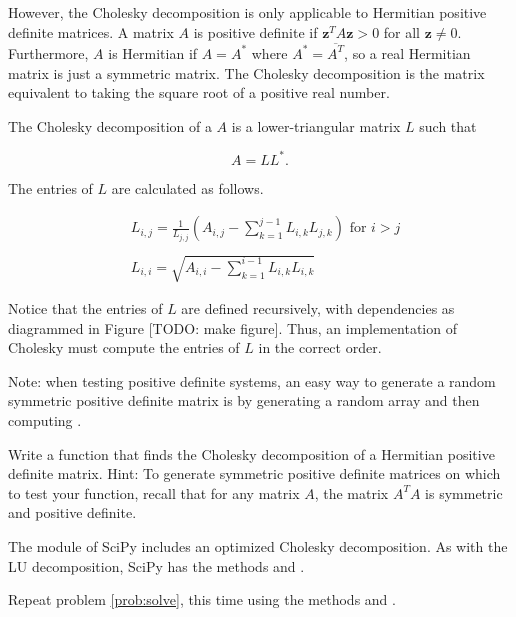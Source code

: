 However, the Cholesky decomposition is only applicable to Hermitian positive definite matrices. A matrix $A$ is positive definite if  $\mathbf{z}^TA\mathbf{z} > 0$ for all $\mathbf{z} \neq 0$. Furthermore, $A$ is Hermitian if $A = A^*$ where $A^* = \overline{A^T}$, so a real Hermitian matrix is just a symmetric matrix. The Cholesky decomposition is the matrix equivalent to taking the square root of a positive real number.

The Cholesky decomposition of a $A$ is a lower-triangular matrix $L$ such that

\begin{equation*}
 A = LL^*.
\end{equation*}

The entries of $L$ are calculated as follows.

\begin{align*}
&L_{i,j} = \frac{1}{L_{j,j}}\left(A_{i,j} -\sum_{k=1}^{j-1}{L_{i,k}L_{j,k}}\right) \mbox{ for $i>j$} \\ \\
&L_{i,i} = \sqrt{A_{i,i} - \sum_{k=1}^{i-1}{L_{i,k}L_{i,k}}}
\end{align*}

Notice that the entries of $L$ are defined recursively, with dependencies as diagrammed in Figure [TODO: make figure]. Thus, an implementation of Cholesky must compute the entries of $L$ in the correct order.

Note: when testing positive definite systems, an easy way to generate a random symmetric positive definite matrix is by generating a random array  and then computing .

\begin{problem}[Optional]
Write a function that finds the Cholesky decomposition of a Hermitian positive definite matrix.
Hint: To generate symmetric positive definite matrices on which to test your function, recall that for any matrix $A$, the matrix $A^TA$ is symmetric and positive definite.
\end{problem}

The  module of SciPy includes an optimized Cholesky decomposition. As with the LU decomposition, SciPy has the methods  and .

\begin{problem}[Optional]
Repeat problem \ref{prob:solve}, this time using the methods  and .
\end{problem} 
